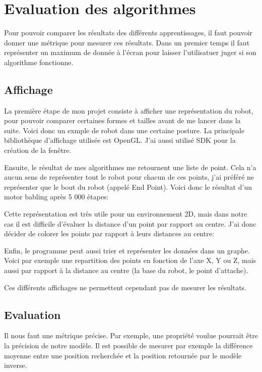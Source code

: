 \documentclass{article}
\begin{document}
\section*{Evaluation des algorithmes}

Pour pouvoir comparer les résultats des différents apprentissages, il faut pouvoir donner une métrique pour mesurer ces résultats. Dans un premier temps il faut représenter un maximum de donnée à l'écran pour laisser l'utilisatuer juger si son algorithme fonctionne.

\subsection*{Affichage}

La première étape de mon projet consiste à afficher une représentation du robot, pour pouvoir comparer certaines formes et tailles avant de me lancer dans la suite. Voici donc un exmple de robot dans une certaine posture. La principale bibliothèque d'affichage utilisée est OpenGL. J'ai aussi utilisé SDK pour la création de la fenêtre.


Ensuite, le résultat de mes algorithmes me retournent une liste de point. Cela n'a aucun sens de représenter tout le robot pour chacun de ces points, j'ai préféré ne représenter que le bout du robot (appelé End Point). Voici donc le résultat d'un motor babling après 5 000 étapes:


Cette représentation est très utile pour un environnement 2D, mais dans notre cas il est difficile d'évaluer la distance d'un point par rapport au centre. J'ai donc décider de colorer les points par rapport à leurs distances au centre:


Enfin, le programme peut aussi trier et représenter les données dans un graphe. Voici par exemple une repartition des points en fonction de l'axe X, Y ou Z, mais aussi par rapport à la distance au centre (la base du robot, le point d'attache).


Ces différents affichages ne permettent cependant pas de mesurer les résultats.

\subsection*{Evaluation}

Il nous faut une métrique précise. Par exemple, une propriété voulue pourrait être la précision de notre modèle. Il est possible de mesurer par exemple la différence moyenne entre une position recherchée et la position retournée par le modèle inverse. 
\end{document}
